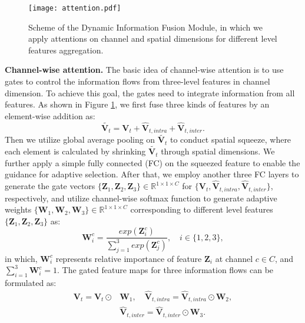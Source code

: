 \documentclass[letterpaper]{article} \usepackage{aaai20}  \usepackage{times}  \usepackage{helvet} \usepackage{courier}  \usepackage[hyphens]{url}  \usepackage{graphicx} \urlstyle{rm} \def\UrlFont{\rm}  \usepackage{graphicx}  \frenchspacing  \setlength{\pdfpagewidth}{8.5in}  \setlength{\pdfpageheight}{11in}  \usepackage{amssymb}
\begin{document}
\begin{figure}[t!]
\centering
\texttt{[image: attention.pdf]}
\caption{Scheme of the Dynamic Information Fusion Module, in which we apply attentions on channel and spatial dimensions for different level features aggregation.}
\label{fig:attention}
\vspace{-12pt}
\end{figure}

\noindent \textbf{Channel-wise attention.}
The basic idea of channel-wise attention is to use gates to control the information flows from three-level features in channel dimension. To achieve this goal, the gates need to integrate information from all features. As shown in Figure \ref{fig:attention}, we first fuse three kinds of features by an element-wise addition as:
\begin{equation}
    \tilde{\bm{V}_t} = \bm{V}_t +\hat{\bm{V}}_{t,intra} +\hat{\bm{V}}_{t,inter}.
\end{equation}
Then we utilize global average pooling on $\tilde{\bm{V}_t}$ to conduct spatial squeeze, where each element is calculated by shrinking $\tilde{\bm{V}_t}$ through spatial dimensions. We further apply a simple fully connected (FC) on the squeezed feature to enable the guidance for adaptive selection. After that, we employ another three FC layers to generate the gate vectors $\{\bm{Z}_1,\bm{Z}_2,\bm{Z}_3\} \in \mathbb{R}^{1 \times 1 \times C}$ for $\{\bm{V}_t,\hat{\bm{V}}_{t,intra},\hat{\bm{V}}_{t,inter}\}$, respectively, and utilize
channel-wise softmax function to generate adaptive weights $\{\bm{W}_1,\bm{W}_2,\bm{W}_3\}  \in \mathbb{R}^{1 \times 1 \times C}$ corresponding to different level features $\{\bm{Z}_1,\bm{Z}_2,\bm{Z}_3\}$ as:
\begin{equation}
    \bm{W}^c_i = \frac{exp(\bm{Z}_i^c)}{\sum_{j=1}^3 exp(\bm{Z}_j^c)}, \quad i \in \{1,2,3\},
\end{equation}
in which, $\bm{W}^c_i$ represents relative importance of feature $\bm{Z}_i$ at channel $c \in C$, and $\sum_{i=1}^3\bm{W}^c_i=1$.
The gated feature maps for three information flows can be formulated as:
\begin{equation}
\begin{aligned}
    \bm{V}_t = \bm{V}_t \odot & \bm{W}_1, \quad
    \hat{\bm{V}}_{t,intra} = \hat{\bm{V}}_{t,intra} \odot \bm{W}_2, \\
&\hat{\bm{V}}_{t,inter} = \hat{\bm{V}}_{t,inter} \odot \bm{W}_3.
\end{aligned}
\end{equation}
\end{document}
